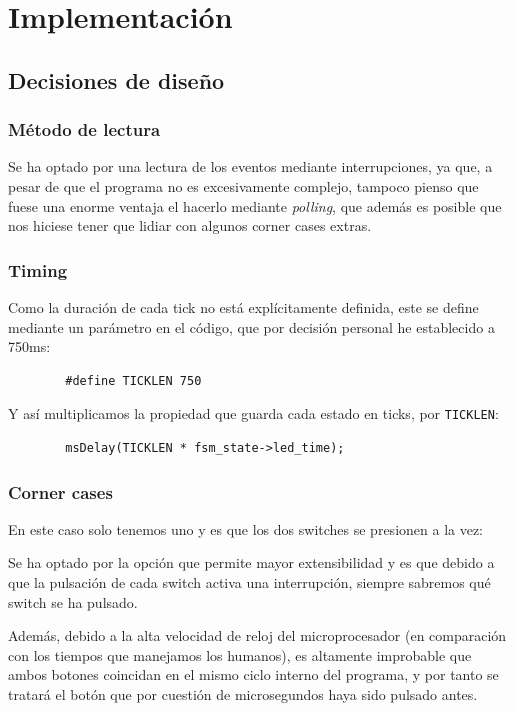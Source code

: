 \documentclass[a4paper,openright,12pt]{article}
\begin{document}
\section{Implementación}
\subsection{Decisiones de diseño}
\subsubsection{Método de lectura}\label{reading_method}
Se ha optado por una lectura de los eventos mediante interrupciones, ya que, a pesar de que el programa no es excesivamente complejo, tampoco pienso que fuese una enorme ventaja el
hacerlo mediante \emph{polling}, que además es posible que nos hiciese tener que lidiar con algunos corner cases extras.

\subsubsection{Timing}\label{ticklen_duration}
Como la duración de cada tick no está explícitamente definida, este se define mediante un parámetro en el código, que por decisión personal
he establecido a 750ms:
\begin{verbatim}
        #define TICKLEN 750
\end{verbatim}

Y así multiplicamos la propiedad que guarda cada estado en ticks, por \texttt{TICKLEN}:
\begin{verbatim}
        msDelay(TICKLEN * fsm_state->led_time);
\end{verbatim}

\subsubsection{Corner cases}
En este caso solo tenemos uno y es que los dos switches se presionen a la vez:

Se ha optado por la opción que permite mayor extensibilidad y es que debido a que la pulsación de cada switch activa una interrupción,
siempre sabremos qué switch se ha pulsado.

Además, debido a la alta velocidad de reloj del microprocesador (en comparación con los tiempos que manejamos los humanos), es altamente improbable que ambos botones coincidan
en el mismo ciclo interno del programa, y por tanto se tratará el botón que por cuestión de microsegundos haya sido pulsado antes.
\end{document}
